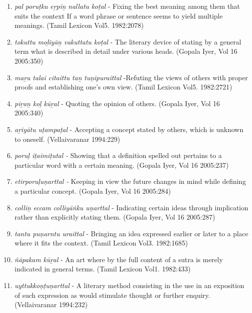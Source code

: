 \begin{enumerate}
 \item \textit{pal poruṭku eṟpiṉ nallatu koṭal} - Fixing the best meaning among them that suits the context If a word phrase or sentence seems to yield multiple meanings. (Tamil Lexicon Vol5. 1982:2078)

 \item \textit{tokuttu moḻiyāṉ vakuttatu koṭal} - The literary device of stating by a general term what is described in detail under various heads. (Gopala Iyer, Vol 16 2005:350)

 \item \textit{maṟu talai citaittu taṉ tuṇipuraittal} -Refuting the views of others with proper proofs and establishing one’s own view. (Tamil Lexicon Vol5. 1982:2721)

 \item \textit{piṟaṉ koḷ kūṟal} - Quoting the opinion of others. (Gopala Iyer, Vol 16 2005:340)

 \item \textit{ aṟiyātu uṭampaṭal} - Accepting a concept stated by others, which is unknown to oneself. (Vellaivaranar 1994:229)

 \item \textit{poruḷ iṭaimiṭutal -} Showing that a definition spelled out pertains to a particular word with a certain meaning. (Gopala Iyer, Vol 16 2005:237) 

 \item \textit{etirporuḷuṇarttal -} Keeping in view the future changes in mind while defining a particular concept. (Gopala Iyer, Vol 16 2005:284)

 \item \textit{colliṉ eccam colliyāṅku uṇarttal} - Indicating certain ideas through implication rather than explicitly stating them. (Gopala Iyer, Vol 16 2005:287)

 \item \textit{tantu puṇarntu uraittal} - Bringing an idea expressed earlier or later to a place where it fits the context. (Tamil Lexicon Vol3. 1982:1685)

 \item \textit{ñāpakam kūṟal} - An art where by the full content of a sutra is merely indicated in general terms. (Tamil Lexicon Vol1. 1982:433)

 \item \textit{uyttukkoṇṭuṇarttal} - A literary method consisting in the use in an exposition of such expression as would stimulate thought or further enquiry. (Vellaivaranar 1994:232)

\end{enumerate}

